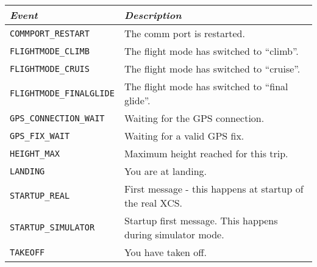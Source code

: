{\footnotesize
\begin{tabular}{l|p{5.6cm}}
\emph{Event} & \emph{Description} \\
\hline

\verb|COMMPORT_RESTART| & The comm port is restarted. \\

\hline

\verb|FLIGHTMODE_CLIMB| & The flight mode has switched to ``climb''. \\

\hline

\verb|FLIGHTMODE_CRUIS| & The flight mode has switched to ``cruise''. \\

\hline

\verb|FLIGHTMODE_FINALGLIDE| & The flight mode has switched to ``final
glide''. \\

\hline

\verb|GPS_CONNECTION_WAIT| & Waiting for the GPS connection. \\

\hline

\verb|GPS_FIX_WAIT| & Waiting for a valid GPS fix. \\

\hline

\verb|HEIGHT_MAX| & Maximum height reached for this trip. \\

\hline

\verb|LANDING| & You are at landing. \\

\hline

\verb|STARTUP_REAL| & First message - this happens at startup of the
real XCS. \\

\hline

\verb|STARTUP_SIMULATOR| & Startup first message. This happens during
simulator mode. \\

\hline

\verb|TAKEOFF| & You have taken off. \\

\end{tabular}}
